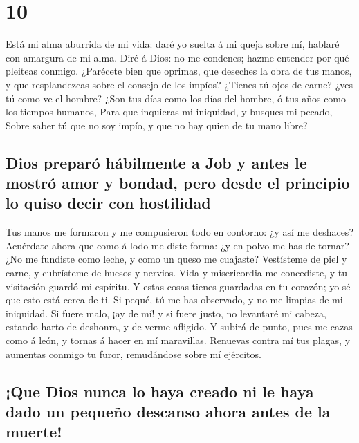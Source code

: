\hypertarget{section-9}{%
\section{10}\label{section-9}}

 Está mi alma aburrida de mi vida: daré yo suelta á mi queja
sobre mí, hablaré con amargura de mi alma.  Diré á Dios: no
me condenes; hazme entender por qué pleiteas conmigo. 
¿Parécete bien que oprimas, que deseches la obra de tus manos, y que
resplandezcas sobre el consejo de los impíos?  ¿Tienes tú
ojos de carne? ¿ves tú como ve el hombre?  ¿Son tus días
como los días del hombre, ó tus años como los tiempos humanos,
 Para que inquieras mi iniquidad, y busques mi pecado,
 Sobre saber tú que no soy impío, y que no hay quien de tu
mano libre?

\hypertarget{dios-preparuxf3-huxe1bilmente-a-job-y-antes-le-mostruxf3-amor-y-bondad-pero-desde-el-principio-lo-quiso-decir-con-hostilidad}{%
\subsection{Dios preparó hábilmente a Job y antes le mostró amor y
bondad, pero desde el principio lo quiso decir con
hostilidad}\label{dios-preparuxf3-huxe1bilmente-a-job-y-antes-le-mostruxf3-amor-y-bondad-pero-desde-el-principio-lo-quiso-decir-con-hostilidad}}

 Tus manos me formaron y me compusieron todo en contorno: ¿y
así me deshaces?  Acuérdate ahora que como á lodo me diste
forma: ¿y en polvo me has de tornar?  ¿No me fundiste como
leche, y como un queso me cuajaste?  Vestísteme de piel y
carne, y cubrísteme de huesos y nervios.  Vida y
misericordia me concediste, y tu visitación guardó mi espíritu.
 Y estas cosas tienes guardadas en tu corazón; yo sé que
esto está cerca de ti.  Si pequé, tú me has observado, y no
me limpias de mi iniquidad.  Si fuere malo, ¡ay de mí! y si
fuere justo, no levantaré mi cabeza, estando harto de deshonra, y de
verme afligido.  Y subirá de punto, pues me cazas como á
león, y tornas á hacer en mí maravillas.  Renuevas contra
mí tus plagas, y aumentas conmigo tu furor, remudándose sobre mí
ejércitos.

\hypertarget{que-dios-nunca-lo-haya-creado-ni-le-haya-dado-un-pequeuxf1o-descanso-ahora-antes-de-la-muerte}{%
\subsection{¡Que Dios nunca lo haya creado ni le haya dado un pequeño
descanso ahora antes de la
muerte!}\label{que-dios-nunca-lo-haya-creado-ni-le-haya-dado-un-pequeuxf1o-descanso-ahora-antes-de-la-muerte}}

